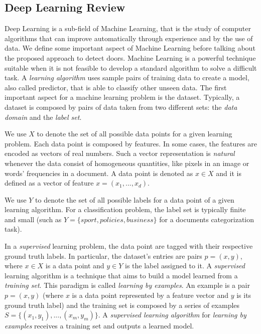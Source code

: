 \subsection{Deep Learning Review}

Deep Learning is a sub-field of Machine Learning, that is the study of computer algorithms that can improve automatically through experience and by the use of data. We define some important aspect of Machine Learning before talking about the proposed approach to detect doors. Machine Learning is a powerful technique suitable when it is not feasible to develop a standard algorithm to solve a difficult task. A \textit{learning algorithm} uses sample pairs of training data to create a model, also called predictor, that is able to classify other unseen data. The first important aspect for a machine learning problem is the dataset. Typically, a dataset is composed by pairs of data taken from two different sets: the \textit{data domain} and the \textit{label set}.

\begin{definition}
	We use $X$ to denote the set of all possible data points for a given learning problem. Each data point is composed by features. In some cases, the features are encoded as vectors of real numbers. Such a vector representation is \textit{natural} whenever the data consist of homogeneous quantities, like pixels in an image or words' frequencies in a document. A data point is denoted as $x \in X$ and it is defined as a vector of feature $x = (x_1, ..., x_d)$.
\end{definition}

\begin{definition}
	We use $Y$ to denote the set of all possible labels for a data point of a given learning algorithm. For a classification problem, the label set is typically finite and small (such as $Y = \{sport, policies, business\}$ for a documents categorization task).
\end{definition}

In a \textit{supervised} learning problem, the data point are tagged with their respective ground truth labels. In particular, the dataset's entries are pairs $p = (x, y)$, where $x \in X$ is a data point and $y \in Y$ is the label assigned to it. A \textit{supervised} learning algorithm is a technique that aims to build a model learned from a \textit{training set}. This paradigm is called \textit{learning by examples}. An example is a pair $p=(x, y)$ (where $x$ is a data point represented by a feature vector and $y$ is its ground truth label) and the training set is composed by a series of examples $S=\{(x_1, y_1), ..., (x_m, y_m)\}$. A \textit{supervised learning algorithm} for \textit{learning by examples} receives a training set and outputs a learned model.


